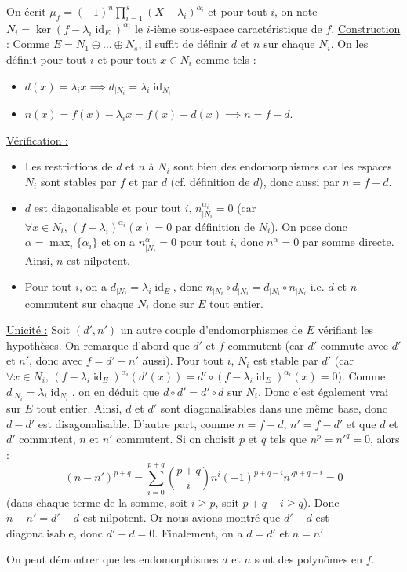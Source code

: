 	\begin{demonstration}
		On écrit $\mu_f = (-1)^n \prod_{i=1}^s (X - \lambda_i)^{\alpha_i}$ et pour tout $i$, on note $N_i = \ker{(f-\lambda_i \operatorname{id}_E)^{\alpha_i}}$ le $i$-ième sous-espace caractéristique de $f$.
		\newpar
		\underline{Construction :} Comme $E = N_1 \oplus \dots \oplus N_s$, il suffit de définir $d$ et $n$ sur chaque $N_i$. On les définit pour tout $i$ et pour tout $x \in N_i$ comme tels :
		\begin{itemize}
			\item $d(x) = \lambda_i x \implies d_{|N_i} = \lambda_i \operatorname{id}_{N_i}$
			\item $n(x) = f(x) - \lambda_i x = f(x) - d(x) \implies n = f - d$.
		\end{itemize}
		\medskip
		\underline{Vérification :}
		\begin{itemize}
			\item Les restrictions de $d$ et $n$ à $N_i$ sont bien des endomorphismes car les espaces $N_i$ sont stables par $f$ et par $d$ (cf. définition de $d$), donc aussi par $n = f - d$.
			\item $d$ est diagonalisable et pour tout $i$, $n_{|N_i}^{\alpha_i} = 0$ (car $\forall x \in N_i, \, (f-\lambda_i)^{\alpha_i}(x) = 0$ par définition de $N_i$). On pose donc $\alpha = \max_{i} \{ \alpha_i \}$ et on a $n_{|N_i}^\alpha = 0$ pour tout $i$, donc $n^\alpha = 0$ par somme directe. Ainsi, $n$ est nilpotent.
			\item Pour tout $i$, on a $d_{|N_i} = \lambda_i \operatorname{id}_E$, donc $n_{|N_i} \circ d_{|N_i} = d_{|N_i} \circ n_{|N_i}$ i.e. $d$ et $n$ commutent sur chaque $N_i$ donc sur $E$ tout entier.
		\end{itemize}
		\medskip
		\underline{Unicité :} Soit $(d', n')$ un autre couple d'endomorphismes de $E$ vérifiant les hypothèses. On remarque d'abord que $d'$ et $f$ commutent (car $d'$ commute avec $d'$ et $n'$, donc avec $f = d' + n'$ aussi). Pour tout $i$, $N_i$ est stable par $d'$ (car $\forall x \in N_i, \, (f-\lambda_i \operatorname{id}_E)^{\alpha_i}(d'(x)) = d' \circ (f-\lambda_i \operatorname{id}_E)^{\alpha_i}(x) = 0$). Comme $d_{|N_i} = \lambda_i \operatorname{id}_{N_i}$, on en déduit que $d \circ d' = d' \circ d$ sur $N_i$. Donc c'est également vrai sur $E$ tout entier. Ainsi, $d$ et $d'$ sont diagonalisables dans une même base, donc $d - d'$ est disagonalisable.
		\newpar
		D'autre part, comme $n = f-d$, $n' = f-d'$ et que $d$ et $d'$ commutent, $n$ et $n'$ commutent. Si on choisit $p$ et $q$ tels que $n^p = n'^q = 0$, alors :
		\[ (n-n')^{p+q} = \sum_{i=0}^{p+q} \binom{p+q}{i} n^{i} (-1)^{p+q-i} n'^{p+q-i} = 0 \]
		(dans chaque terme de la somme, soit $i \geq p$, soit $p+q-i \geq q$). Donc $n - n' = d' - d$ est nilpotent. Or nous avions montré que $d' - d$ est diagonalisable, donc $d'-d = 0$. Finalement, on a $d = d'$ et $n = n'$.
	\end{demonstration}
	
	\begin{remark}
		On peut démontrer que les endomorphismes $d$ et $n$ sont des polynômes en $f$.
	\end{remark}
